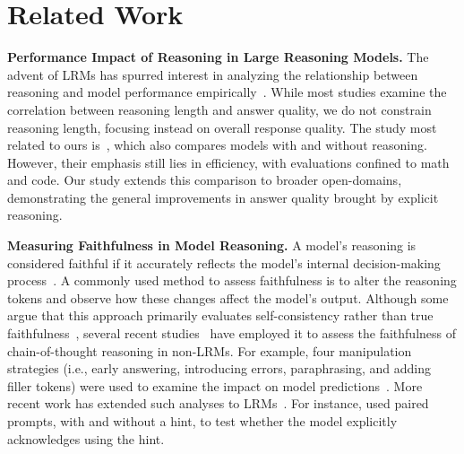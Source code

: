 \documentclass[11pt]{article}
\begin{document}
\section{Related Work}

\noindent \textbf{Performance Impact of Reasoning in Large Reasoning Models.} The advent of LRMs has spurred interest in analyzing the relationship between reasoning and model performance empirically~\cite{muennighoff2025s1simpletesttimescaling, marjanović2025deepseekr1thoughtologyletsthink, ma2025reasoningmodelseffectivethinking, ballon2025relationshipreasoningperformancelarge, su2025underthinkingoverthinkingempiricalstudy, jahin2025unveilingmathematicalreasoningdeepseek}. While most studies examine the correlation between reasoning length and answer quality, we do not constrain reasoning length, focusing instead on overall response quality. The study most related to ours is~\cite{ma2025reasoningmodelseffectivethinking}, which also compares models with and without reasoning. However, their emphasis still lies in efficiency, with evaluations confined to math and code. Our study extends this comparison to broader open-domains, demonstrating the general improvements in answer quality brought by explicit reasoning.


\noindent \textbf{Measuring Faithfulness in Model Reasoning.} A model's reasoning is considered faithful if it accurately reflects the model’s internal decision-making process~\cite{jacovi-goldberg-2020-towards}. A commonly used method to assess faithfulness is to alter the reasoning tokens and observe how these changes affect the model’s output. Although some argue that this approach primarily evaluates self-consistency rather than true faithfulness~\cite{parcalabescu2024measuringfaithfulnessselfconsistencynatural}, several recent studies~\cite{lanham2023measuringfaithfulnesschainofthoughtreasoning, atanasova-etal-2023-faithfulness, NEURIPS2023_ed3fea90} have employed it to assess the faithfulness of chain-of-thought reasoning in non-LRMs. For example, four manipulation strategies (i.e., early answering, introducing errors, paraphrasing, and adding filler tokens) were used to examine the impact on model predictions~\cite{lanham2023measuringfaithfulnesschainofthoughtreasoning}. More recent work has extended such analyses to LRMs~\cite{baker2025monitoring, arcuschin2025chainofthoughtreasoningwildfaithful, chen2025reasoningmodelsdontsay, chua2025deepseekr1reasoningmodels, marjanović2025deepseekr1thoughtologyletsthink}. For instance, \cite{chen2025reasoningmodelsdontsay} used paired prompts, with and without a hint, to test whether the model explicitly acknowledges using the hint.
\end{document}
